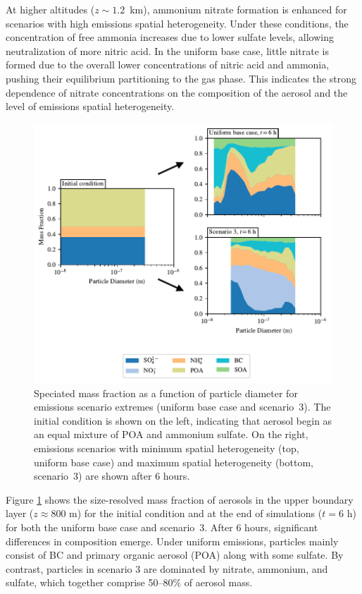 \documentclass[journal abbreviation, manuscript]{copernicus}
\begin{document}
At higher altitudes ($z\sim1.2$~km), ammonium nitrate formation is
enhanced for scenarios with high emissions spatial
heterogeneity. Under these conditions, the concentration of free
ammonia increases due to lower sulfate levels, allowing neutralization
of more nitric acid.  In the uniform base case, little nitrate is
formed due to the overall lower concentrations of nitric acid and
ammonia, pushing their equilibrium partitioning to the gas phase. This
indicates the strong dependence of nitrate concentrations on the
composition of the aerosol and the level of emissions spatial
heterogeneity.


\begin{figure}[!h]
	\centering
	\includegraphics[]{figures/speciated-mass-frac-three-panel-z40.pdf}
	\caption{Speciated mass fraction as a function of particle
          diameter for emissions scenario extremes (uniform base case
          and scenario~3). The initial condition is shown on the left,
          indicating that aerosol begin as an equal mixture of POA and
          ammonium sulfate. On the right, emissions scenarios with
          minimum spatial heterogeneity (top, uniform base case) and
          maximum spatial heterogeneity (bottom, scenario~3) are shown
          after 6 hours.}
	\label{fig:speciated-mass-frac}
\end{figure} 

Figure \ref{fig:speciated-mass-frac} shows the size-resolved mass
fraction of aerosols in the upper boundary layer ($z\approx 800$ m)
for the initial condition and at the end of simulations ($t=6$ h) for
both the uniform base case and scenario~3. After 6 hours, significant
differences in composition emerge. Under uniform emissions, particles
mainly consist of BC and primary organic aerosol (POA) along with some
sulfate. By contrast, particles in scenario 3 are dominated by
nitrate, ammonium, and sulfate, which together comprise 50--80\% of
aerosol mass.
\end{document}
